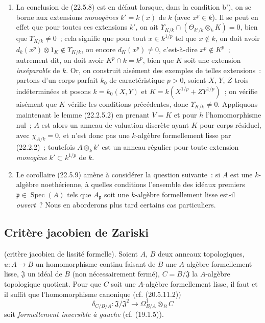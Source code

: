 \begin{remark}[22.5.10]
\label{0.22.5.10-fr}
\begin{enumerate}
  \item[\rm(i)] La conclusion de (22.5.8) est en défaut lorsque, dans la
  condition b'), on se borne aux extensions \emph{monogènes} $k'=k(x)$ de $k$
  (avec $x^p\in k$). Il se peut en effet que pour toutes ces extensions $k'$,
  on ait
  $\Upsilon_{K/k}\cap(\Theta_{k'/k}\otimes_kK)=0$, bien que
  $\Upsilon_{K/k}\neq0$~; cela signifie que pour tout $x\in k^{1/p}$ tel que
  $x\notin k$, on doit avoir
  $d_k(x^p)\otimes1_K\notin\Upsilon_{K/k}$, ou encore $d_K(x^p)\neq0$,
  c'est-à-dire $x^p\notin K^p$~; autrement dit, on doit avoir
  $K^p\cap k=k^p$, bien que $K$ soit une extension \emph{inséparable} de $k$.
  Or, on construit aisément des exemples de telles extensions~: partons d'un
  corps parfait $k_0$ de caractéristique $p>0$, soient $X$, $Y$, $Z$ trois
  indéterminées et posons $k=k_0(X,Y)$ et
  $K=k(X^{1/p}+ZY^{1/p})$~; on vérifie aisément que $K$ vérifie les conditions
  précédentes, donc $\Upsilon_{K/k}\neq0$. Appliquons maintenant le lemme
  (22.2.5.2) en prenant $V=K$ et pour $h$ l'homomorphisme nul~; $A$ est alors
  un anneau de valuation discrète ayant $K$ pour corps résiduel, avec
  $\chi_{A/k}=0$, et n'est donc pas une $k$-algèbre formellement lisse par
  (22.2.2)~; toutefois $A\otimes_kk'$ est un anneau régulier pour toute
  extension \emph{monogène} $k'\subset k^{1/p}$ de $k$.


  \item[\rm(ii)] Le corollaire (22.5.9) amène à considérer la question
  suivante~: si $A$ est une $k$-algèbre noethérienne, à quelles conditions
  l'ensemble des idéaux premiers $\mathfrak p\in\operatorname{Spec}(A)$ tels que
  $A_{\mathfrak p}$ soit une $k$-algèbre formellement lisse est-il
  \emph{ouvert}~? Nous en aborderons plus tard certains cas particuliers.
\end{enumerate}
\end{remark}

\subsection{Critère jacobien de Zariski}
\label{subsection:0.22.6-fr}

\begin{theorem}[22.6.1]
\label{0.22.6.1-fr}
\textnormal{(critère jacobien de lissité formelle).}
Soient $A$, $B$ deux anneaux topologiques,
$u:A\longrightarrow B$ un homomorphisme continu faisant de $B$ une
$A$-algèbre formellement lisse, $\mathfrak J$ un idéal de $B$ (non
nécessairement fermé), $C=B/\mathfrak J$ la $A$-algèbre topologique quotient.
Pour que $C$ soit une $A$-algèbre formellement lisse, il faut et il suffit que
l'homomorphisme canonique (cf. (20.5.11.2))
\begin{equation}
\label{0.22.6.1.1-fr}
  \delta_{C/B/A}:\mathfrak J/\mathfrak J^2
  \longrightarrow\Omega^1_{B/A}\otimes_BC
  \tag{22.6.1.1}
\end{equation}
soit \emph{formellement inversible à gauche} (cf. (19.1.5)).
\end{theorem}


